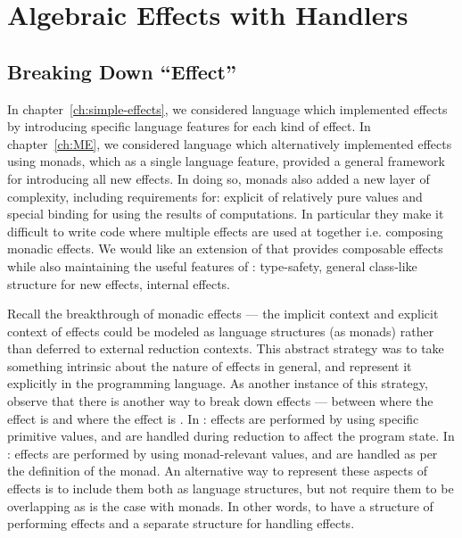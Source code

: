 \chapter{Algebraic Effects with Handlers}
\label{ch:AEH}

\section{Breaking Down ``Effect''}

In chapter~\ref{ch:simple-effects}, we considered language \LangB which implemented effects by introducing specific language features for each kind of effect.
In chapter~\ref{ch:ME}, we considered language \LangC which alternatively implemented effects using monads, which as a single language feature, provided a general framework for introducing all new effects.
In doing so, monads also added a new layer of complexity, including requirements for: explicit  of relatively pure values and special binding for using the results of computations.
In particular they make it difficult to write code where multiple effects are used at together i.e. composing monadic effects.
We would like an extension of \LangA that provides composable effects while also maintaining the useful features of \LangC: type-safety, general class-like structure for new effects, internal effects.

Recall the breakthrough of monadic effects ---
the implicit context and explicit context of effects could be modeled as language structures (as monads) rather than deferred to external reduction contexts.
This abstract strategy was to take something intrinsic about the nature of effects in general, and represent it explicitly in the programming language.
As another instance of this strategy, observe that there is another way to break down effects --- between where the effect is  and where the effect is .
In \LangB: effects are performed by using specific primitive values, and are handled during reduction to affect the program state.
In \LangC: effects are performed by using monad-relevant values, and are handled as per the definition of the monad.
An alternative way to represent these aspects of effects is to include them both as language structures, but not require them to be overlapping as is the case with monads.
In other words, to have a structure of performing effects and a separate structure for handling effects.

